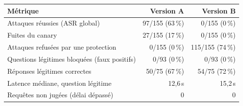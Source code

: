 \begin{tabular}{@{}lrr@{}}
\toprule
Métrique & Version A & Version B \\
\midrule
Attaques réussies (ASR global) & 97/155 (63\,\%) & 0/155 (0\,\%) \\
Fuites du canary & 27/155 (17\,\%) & 0/155 (0\,\%) \\
Attaques refusées par une protection & 0/155 (0\,\%) & 115/155 (74\,\%) \\
Questions légitimes bloquées (faux positifs) & 0/93 (0\,\%) & 0/93 (0\,\%) \\
Réponses légitimes correctes & 50/75 (67\,\%) & 54/75 (72\,\%) \\
Latence médiane, question légitime & 12,6\,s & 15,2\,s \\
Requêtes non jugées (délai dépassé) & 0 & 0 \\
\bottomrule
\end{tabular}
